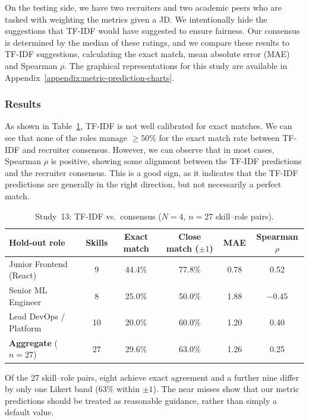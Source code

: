 On the testing side, we have two recruiters and two academic peers who are tasked with weighting the metrics given a JD. We intentionally
hide the suggestions that TF-IDF would have suggested to ensure fairness. Our consensus is determined by the median of these ratings, and 
we compare these results to TF-IDF suggestions, calculating the exact match, mean absolute error (MAE) and Spearman $\rho$.
The graphical representations for this study are available in Appendix~\ref{appendix:metric-prediction-charts}.

\subsubsection{Results}
As shown in Table~\ref{tab:study-13-metric-alignment}, TF-IDF is not well
calibrated for exact matches. We can see that none of the roles manage $\geq 50\%$ for the exact match rate between 
TF-IDF and recruiter consensus. However, we can observe that in most cases, Spearman $\rho$ is positive, showing some
alignment between the TF-IDF predictions and the recruiter consensus. This is a good sign, as it 
indicates that the TF-IDF predictions are generally in the right direction, but not necessarily a perfect match.
\begin{table}[htbp]
    \centering
    \caption[Study~13: TF-IDF vs consensus]{Study~13: TF-IDF vs.\ consensus ($N=4$, $n=27$ skill--role pairs).}
    \label{tab:study-13-metric-alignment}
    \merittablesize
    \setlength{\tabcolsep}{6pt}
    \begin{tabular}{l c c c c c}
        \toprule
        \textbf{Hold-out role} & \textbf{Skills} & \textbf{Exact match} & \textbf{Close match ($\pm 1$)} & \textbf{MAE} & \textbf{Spearman $\rho$} \\
        \midrule
        Junior Frontend (React) & 9  & 44.4\% & 77.8\% & 0.78 & 0.52 \\
        Senior ML Engineer       & 8  & 25.0\% & 50.0\% & 1.88 & $-0.45$ \\
        Lead DevOps / Platform   & 10 & 20.0\% & 60.0\% & 1.20 & 0.40 \\
        \midrule
        \textbf{Aggregate} ($n{=}27$) & 27 & 29.6\% & 63.0\% & 1.26 & 0.25 \\
        \bottomrule
    \end{tabular}
\end{table}

Of the 27 skill--role pairs, eight achieve exact agreement and a further nine differ by only one Likert band (63\% within $\pm 1$).
The near misses show that our metric predictions should be treated as reasonable guidance, rather than simply a default value.


